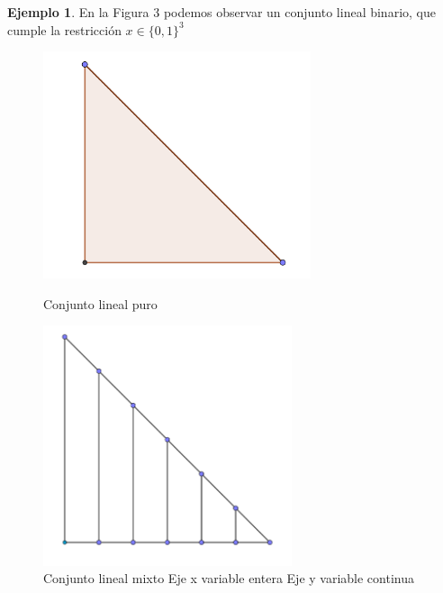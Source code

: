 \documentclass[10pt]{article}
\theoremstyle{plain}
\theoremstyle{definition}
\newtheorem{eje}{Ejemplo}
\begin{document}
\begin{eje}
En la Figura 3 podemos observar un conjunto lineal binario, que cumple la restricción $x \in \{0,1\}^3$
\begin{figure}[h!]
    \centering
    \begin{minipage}{0.45\textwidth}
        \centering
        \includegraphics[width=0.7\textwidth]{Img1.PNG} %
        \caption{Conjunto lineal puro}
    \end{minipage}\hfill
    \begin{minipage}{0.45\textwidth}
        \centering
        \includegraphics[width=0.65\textwidth]{Img2.PNG} %
        \caption{Conjunto lineal mixto \newline \hspace*{1.5cm} Eje x variable entera \newline \hspace*{1.5cm} Eje y variable continua}
    \end{minipage}
\end{figure}

\end{eje}
\end{document}
